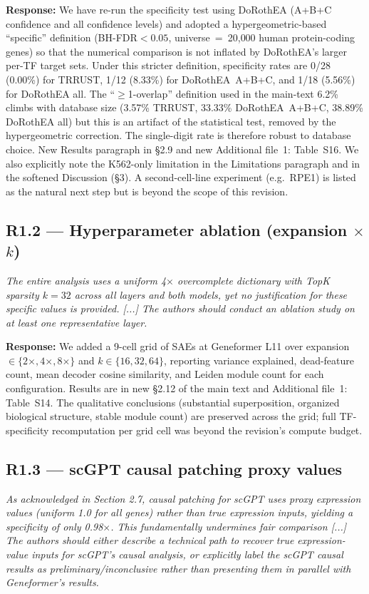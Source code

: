 \documentclass[11pt]{article}
\newcommand{\reviewercomment}[1]{\textit{\color{gray}#1}}
\newcommand{\response}[1]{\textbf{Response:} #1}
\begin{document}
\response{We have re-run the specificity test using DoRothEA (A+B+C confidence and all confidence levels) and adopted a hypergeometric-based ``specific'' definition (BH-FDR$<0.05$, universe~=~20{,}000 human protein-coding genes) so that the numerical comparison is not inflated by DoRothEA's larger per-TF target sets. Under this stricter definition, specificity rates are 0/28 (0.00\%) for TRRUST, 1/12 (8.33\%) for DoRothEA~A+B+C, and 1/18 (5.56\%) for DoRothEA all. The ``$\geq$1-overlap'' definition used in the main-text 6.2\% climbs with database size (3.57\% TRRUST, 33.33\% DoRothEA~A+B+C, 38.89\% DoRothEA all) but this is an artifact of the statistical test, removed by the hypergeometric correction. The single-digit rate is therefore robust to database choice. New Results paragraph in \S2.9 and new Additional file~1: Table~S16. We also explicitly note the K562-only limitation in the Limitations paragraph and in the softened Discussion (\S3). A second-cell-line experiment (e.g.\ RPE1) is listed as the natural next step but is beyond the scope of this revision.}

\subsection*{R1.2 --- Hyperparameter ablation (expansion $\times$ $k$)}
\reviewercomment{The entire analysis uses a uniform 4$\times$ overcomplete dictionary with TopK sparsity $k{=}32$ across all layers and both models, yet no justification for these specific values is provided. [...] The authors should conduct an ablation study on at least one representative layer.}

\response{We added a 9-cell grid of SAEs at Geneformer L11 over expansion $\in \{2\times, 4\times, 8\times\}$ and $k \in \{16, 32, 64\}$, reporting variance explained, dead-feature count, mean decoder cosine similarity, and Leiden module count for each configuration. Results are in new \S2.12 of the main text and Additional file~1: Table~S14. The qualitative conclusions (substantial superposition, organized biological structure, stable module count) are preserved across the grid; full TF-specificity recomputation per grid cell was beyond the revision's compute budget.}

\subsection*{R1.3 --- scGPT causal patching proxy values}
\reviewercomment{As acknowledged in Section 2.7, causal patching for scGPT uses proxy expression values (uniform 1.0 for all genes) rather than true expression inputs, yielding a specificity of only 0.98$\times$. This fundamentally undermines fair comparison [...] The authors should either describe a technical path to recover true expression-value inputs for scGPT's causal analysis, or explicitly label the scGPT causal results as preliminary/inconclusive rather than presenting them in parallel with Geneformer's results.}
\end{document}
